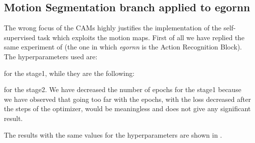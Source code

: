\documentclass[10pt,twocolumn,hidelinks,letterpaper]{article}
\begin{document}
\subsection{Motion Segmentation branch applied to egornn}

The wrong focus of the CAMs  highly justifies the implementation of the self-supervised task which exploits the motion maps. First of all we have replied the same experiment of \cite{sparnet} (the one in which \textit{egornn} is the Action Recognition Block). The hyperparameters used are:

\begin{center}
\end{center}

for the stage1, while they are the following:

\begin{center}
\end{center}

for the stage2. We have decreased the number of epochs for the stage1 because we have observed that going too far with the epochs, with the loss decreased after the steps of the optimizer, would be meaningless and does not give any significant result.

The results with the same values for the hyperparameters are shown in .
\end{document}
